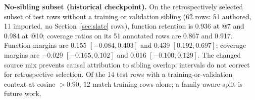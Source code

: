 \textbf{No-sibling subset (historical checkpoint).} On the retrospectively selected subset of test rows without a training or validation sibling (62 rows: 51 authored, 11 imported, no Section~\ref{sec:slate} rows), function retention is 0.936 at @7 and 0.984 at @10; coverage ratios on its 51 annotated rows are 0.867 and 0.917. Function margins are 0.155 $[-0.084,0.403]$ and 0.439 $[0.192,0.697]$; coverage margins are $-0.029$ $[-0.165,0.102]$ and 0.016 $[-0.100,0.129]$. The changed source mix prevents causal attribution to sibling overlap; intervals do not correct for retrospective selection. Of the 14 test rows with a training-or-validation context at cosine $>0.90$, 12 match training rows alone; a family-aware split is future work. %

